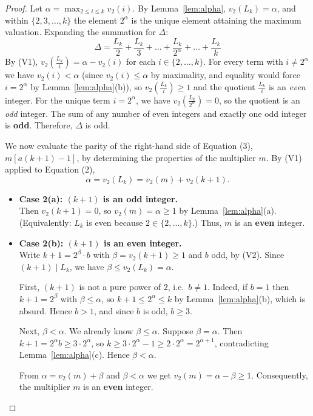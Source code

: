 \documentclass[11pt,a4paper]{article}
\begin{document}
\begin{proof}
Let $\alpha = \max_{2 \leq i \leq k} v_2(i)$. By Lemma~\ref{lem:alpha}, $v_2(L_k) = \alpha$, and within $\{2, 3, \dots, k\}$ the element $2^\alpha$ is the unique element attaining the maximum valuation. Expanding the summation for $\Delta$:
\[
\Delta = \frac{L_k}{2} + \frac{L_k}{3} + \dots + \frac{L_k}{2^\alpha} + \dots + \frac{L_k}{k}
\]
By (V1), $v_2\!\left(\frac{L_k}{i}\right) = \alpha - v_2(i)$ for each $i \in \{2,\dots,k\}$. For every term with $i \neq 2^\alpha$ we have $v_2(i) < \alpha$ (since $v_2(i) \le \alpha$ by maximality, and equality would force $i = 2^\alpha$ by Lemma~\ref{lem:alpha}(b)), so $v_2\!\left(\frac{L_k}{i}\right) \ge 1$ and the quotient $\frac{L_k}{i}$ is an \textit{even} integer. For the unique term $i = 2^\alpha$, we have $v_2\!\left(\frac{L_k}{2^\alpha}\right) = 0$, so the quotient is an \textit{odd} integer. The sum of any number of even integers and exactly one odd integer is \textbf{odd}. Therefore, $\Delta$ is odd.

We now evaluate the parity of the right-hand side of Equation (3), $m[a(k+1) - 1]$, by determining the properties of the multiplier $m$. By (V1) applied to Equation (2),
\[
\alpha = v_2(L_k) = v_2(m) + v_2(k+1).
\]
\begin{itemize}
    \item \textbf{Case 2(a): $(k+1)$ is an odd integer.}\\
    Then $v_2(k+1) = 0$, so $v_2(m) = \alpha \geq 1$ by Lemma~\ref{lem:alpha}(a). (Equivalently: $L_k$ is even because $2 \in \{2,\dots,k\}$.) Thus, $m$ is an \textbf{even} integer.

    \item \textbf{Case 2(b): $(k+1)$ is an even integer.}\\
    Write $k+1 = 2^\beta \cdot b$ with $\beta = v_2(k+1) \ge 1$ and $b$ odd, by (V2). Since $(k+1) \mid L_k$, we have $\beta \le v_2(L_k) = \alpha$.

    First, $(k+1)$ is not a pure power of $2$, i.e.\ $b \ne 1$. Indeed, if $b = 1$ then $k+1 = 2^\beta$ with $\beta \le \alpha$, so $k + 1 \le 2^\alpha \le k$ by Lemma~\ref{lem:alpha}(b), which is absurd. Hence $b > 1$, and since $b$ is odd, $b \ge 3$.

    Next, $\beta < \alpha$. We already know $\beta \le \alpha$. Suppose $\beta = \alpha$. Then $k+1 = 2^\alpha b \ge 3\cdot 2^\alpha$, so $k \ge 3\cdot 2^\alpha - 1 \ge 2\cdot 2^\alpha = 2^{\alpha+1}$, contradicting Lemma~\ref{lem:alpha}(c). Hence $\beta < \alpha$.

    From $\alpha = v_2(m) + \beta$ and $\beta < \alpha$ we get $v_2(m) = \alpha - \beta \geq 1$. Consequently, the multiplier $m$ is an \textbf{even} integer.
\end{itemize}


\end{proof}
\end{document}
